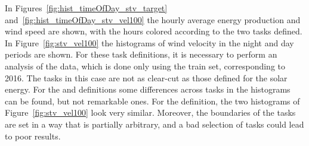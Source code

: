 %
In Figures~\ref{fig:hist_timeOfDay_stv_target} and~\ref{fig:hist_timeOfDay_stv_vel100} the hourly average energy production and wind speed are shown, with the hours colored according to the two tasks defined. In Figure~\ref{fig:stv_vel100} the histograms of wind velocity in the night and day periods are shown.
%
For these task definitions, it is necessary to perform an analysis of the data, which is done only using the train set, corresponding to 2016.
The tasks in this case are not as clear-cut as those defined for the solar energy. For the  and  definitions some differences across tasks in the histograms can be found, but not remarkable ones.
For the  definition, the two histograms of Figure~\ref{fig:stv_vel100} look very similar.
Moreover, the boundaries of the tasks are set in a way that is partially arbitrary, and a bad selection of tasks could lead to poor results.




